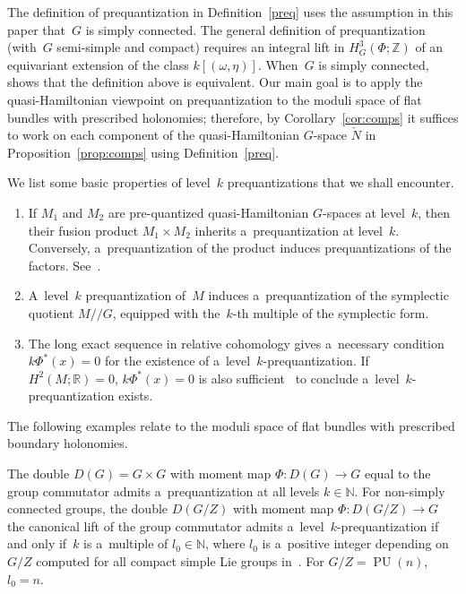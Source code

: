 \documentclass[11pt]{article}
\numberwithin{equation}{section}
\DeclareMathOperator{\PU}{PU}
\begin{document}
\begin{Remark}
The def\/inition of prequantization in Def\/inition~\ref{preq} uses the assumption in this paper that~$G$ is simply
connected.
The general def\/inition of prequantization~\cite[Def\/inition~3.2]{Khomology} (with~$G$ semi-simple and compact) requires
an integral lift in $H^3_G(\Phi;{\mathbb{Z}})$ of an equivariant extension of the class $k[(\omega,\eta)]$.
When~$G$ is simply connected,~\cite[Proposition~3.5]{JGP} shows that the def\/inition above is equivalent.
Our main goal is to apply the quasi-Hamiltonian viewpoint on prequantization to the moduli space of f\/lat bundles with
prescribed holonomies; therefore, by Corollary~\ref{cor:comps} it suf\/f\/ices to work on each component of the
quasi-Hamiltonian $G$-space $\check{N}$ in Proposition~\ref{prop:comps} using Def\/inition~\ref{preq}.
\end{Remark}

We list some basic properties of level~$k$ prequantizations that we shall encounter.
\begin{enumerate}\itemsep=0pt
\item[(a)] If $M_1$ and $M_2$ are pre-quantized quasi-Hamiltonian $G$-spaces at level~$k$, then their fusion product
$M_1 \times M_2$ inherits a~prequantization at level~$k$.
Conversely, a~prequantization of the product induces prequantizations of the factors.
See~\cite[Proposition~3.8]{JGP}.
\item[(b)] A~level~$k$ prequantization of~$M$ induces a~prequantization of the symplectic quotient $M/  / G$, equipped
with the~$k$-th multiple of the symplectic form.
\item[(c)] The long exact sequence in relative cohomology gives a~necessary condition $k\Phi^*(x)=0$ for the existence
of a~level~$k$-prequantization.
If $H^2(M;{\mathbb{R}})=0$, $k\Phi^*(x)=0$ is also suf\/f\/icient~\cite[Proposition~4.2]{JGP} to conclude
a~level~$k$-prequantization exists.
\end{enumerate}

The following examples relate to the moduli space of f\/lat bundles with prescribed boundary holonomies.

\begin{Example}
\label{eg:double}
The double $D(G)=G\times G$ with moment map $\Phi: D(G) \to G$ equal to the group commutator admits a~prequantization at
all levels $k\in {\mathbb{N}}$.
For non-simply connected groups, the double $D(G/Z)$ with moment map $\Phi: D(G/Z) \to G$ the canonical lift of the
group commutator admits a~level~$k$-prequantization if and only if~$k$ is a~multiple of $l_0 \in {\mathbb{N}}$, where
$l_0$ is a~positive integer depending on $G/Z$ computed for all compact simple Lie groups in~\cite{JGP}.
For $G/Z = \PU(n)$, $l_0=n$.
\end{Example}
\end{document}
